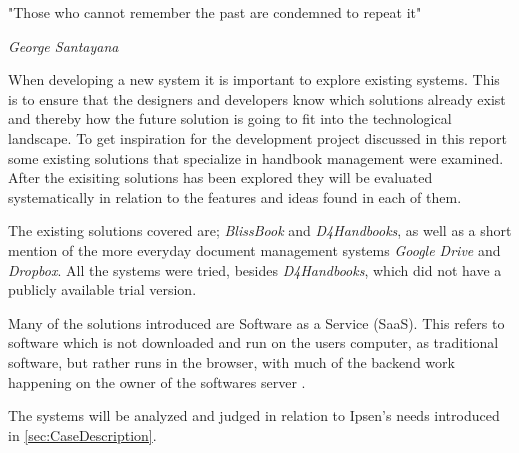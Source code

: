 \documentclass[../../master.tex]{subfiles}
\begin{document}
\epigraph{"Those who cannot remember the past are condemned to repeat it"}{\textit{George Santayana}}
When developing a new system it is important to explore existing systems.
This is to ensure that the designers and developers know which solutions already exist and thereby how the future solution is going to fit into the technological landscape.
To get inspiration for the development project discussed in this report some existing solutions that specialize in handbook management were examined.
After the exisiting solutions has been explored they will be evaluated systematically in relation to the features and ideas found in each of them.



The existing solutions covered are; \textit{BlissBook} and \textit{D4Handbooks}, as well as a short mention of the more everyday document management systems \textit{Google Drive} and \textit{Dropbox}.
All the systems were tried, besides \textit{D4Handbooks}, which did not have a publicly available trial version.

Many of the solutions introduced are Software as a Service (SaaS).
This refers to software which is not downloaded and run on the users computer, as traditional software, but rather runs in the browser, with much of the backend work happening on the owner of the softwares server \cite{saas}.

The systems will be analyzed and judged in relation to Ipsen's needs introduced in \cref{sec:CaseDescription}.
\end{document}
